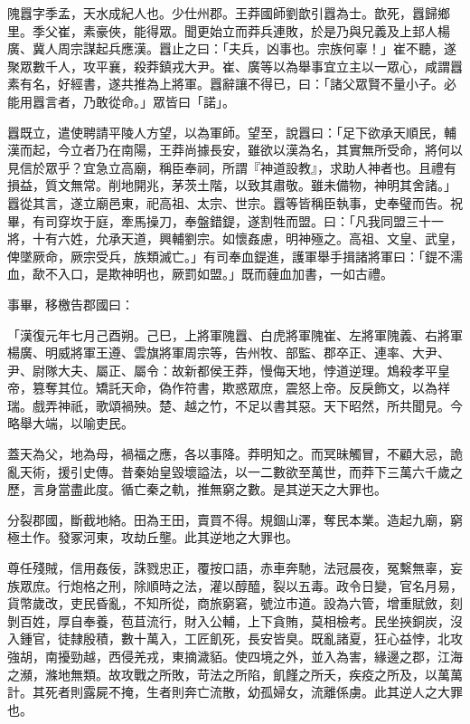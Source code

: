 
\begin{pinyinscope}
隗囂字季孟，天水成紀人也。少仕州郡。王莽國師劉歆引囂為士。歆死，囂歸鄉里。季父崔，素豪俠，能得眾。聞更始立而莽兵連敗，於是乃與兄義及上邽人楊廣、冀人周宗謀起兵應漢。囂止之曰：「夫兵，凶事也。宗族何辜！」崔不聽，遂聚眾數千人，攻平襄，殺莽鎮戎大尹。崔、廣等以為舉事宜立主以一眾心，咸謂囂素有名，好經書，遂共推為上將軍。囂辭讓不得已，曰：「諸父眾賢不量小子。必能用囂言者，乃敢從命。」眾皆曰「諾」。

囂既立，遣使聘請平陵人方望，以為軍師。望至，說囂曰：「足下欲承天順民，輔漢而起，今立者乃在南陽，王莽尚據長安，雖欲以漢為名，其實無所受命，將何以見信於眾乎？宜急立高廟，稱臣奉祠，所謂『神道設教』，求助人神者也。且禮有損益，質文無常。削地開兆，茅茨土階，以致其肅敬。雖未備物，神明其舍諸。」囂從其言，遂立廟邑東，祀高祖、太宗、世宗。囂等皆稱臣執事，史奉璧而告。祝畢，有司穿坎于庭，牽馬操刀，奉盤錯鍉，遂割牲而盟。曰：「凡我同盟三十一將，十有六姓，允承天道，興輔劉宗。如懷姦慮，明神殛之。高祖、文皇、武皇，俾墜厥命，厥宗受兵，族類滅亡。」有司奉血鍉進，護軍舉手揖諸將軍曰：「鍉不濡血，歃不入口，是欺神明也，厥罰如盟。」既而薶血加書，一如古禮。

事畢，移檄告郡國曰：

「漢復元年七月己酉朔。己巳，上將軍隗囂、白虎將軍隗崔、左將軍隗義、右將軍楊廣、明威將軍王遵、雲旗將軍周宗等，告州牧、部監、郡卒正、連率、大尹、尹、尉隊大夫、屬正、屬令：故新都侯王莽，慢侮天地，悖道逆理。鴆殺孝平皇帝，篡奪其位。矯託天命，偽作符書，欺惑眾庶，震怒上帝。反戾飾文，以為祥瑞。戲弄神祇，歌頌禍殃。楚、越之竹，不足以書其惡。天下昭然，所共聞見。今略舉大端，以喻吏民。

蓋天為父，地為母，禍福之應，各以事降。莽明知之。而冥昧觸冒，不顧大忌，詭亂天術，援引史傳。昔秦始皇毀壞謚法，以一二數欲至萬世，而莽下三萬六千歲之歷，言身當盡此度。循亡秦之軌，推無窮之數。是其逆天之大罪也。

分裂郡國，斷截地絡。田為王田，賣買不得。規錮山澤，奪民本業。造起九廟，窮極土作。發冢河東，攻劫丘壟。此其逆地之大罪也。

尊任殘賊，信用姦佞，誅戮忠正，覆按口語，赤車奔馳，法冠晨夜，冤繫無辜，妄族眾庶。行炮格之刑，除順時之法，灌以醇醯，裂以五毒。政令日變，官名月易，貨幣歲改，吏民昏亂，不知所從，商旅窮窘，號泣市道。設為六管，增重賦斂，刻剝百姓，厚自奉養，苞苴流行，財入公輔，上下貪賄，莫相檢考。民坐挾銅炭，沒入鍾官，徒隸殷積，數十萬入，工匠飢死，長安皆臭。既亂諸夏，狂心益悖，北攻強胡，南擾勁越，西侵羌戎，東摘濊貊。使四境之外，並入為害，緣邊之郡，江海之瀕，滌地無類。故攻戰之所敗，苛法之所陷，飢饉之所夭，疾疫之所及，以萬萬計。其死者則露屍不掩，生者則奔亡流散，幼孤婦女，流離係虜。此其逆人之大罪也。


\end{pinyinscope}
